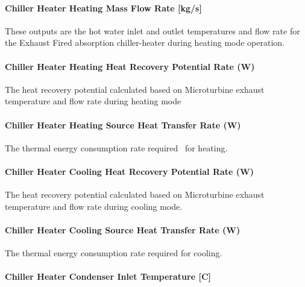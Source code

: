\paragraph{Chiller Heater Heating Mass Flow Rate {[}kg/s{]}}\label{chiller-heater-heating-mass-flow-rate-kgs-1}

These outputs are the hot water inlet and outlet temperatures and flow rate for the Exhaust Fired absorption chiller-heater during heating mode operation.

\paragraph{Chiller Heater Heating Heat Recovery Potential Rate (W)}\label{chiller-heater-heating-heat-recovery-potential-rate-w}

The heat recovery potential calculated based on Microturbine exhaust temperature and flow rate during heating mode

\paragraph{Chiller Heater Heating Source Heat Transfer Rate (W)}\label{chiller-heater-heating-source-heat-transfer-rate-w}

The thermal energy consumption rate required~ for heating.

\paragraph{Chiller Heater Cooling Heat Recovery Potential Rate (W)}\label{chiller-heater-cooling-heat-recovery-potential-rate-w}

The heat recovery potential calculated based on Microturbine exhaust temperature and flow rate during cooling mode.

\paragraph{Chiller Heater Cooling Source Heat Transfer Rate (W)}\label{chiller-heater-cooling-source-heat-transfer-rate-w}

The thermal energy consumption rate required for cooling.

\paragraph{Chiller Heater Condenser Inlet Temperature {[}C{]}}\label{chiller-heater-condenser-inlet-temperature-c}

